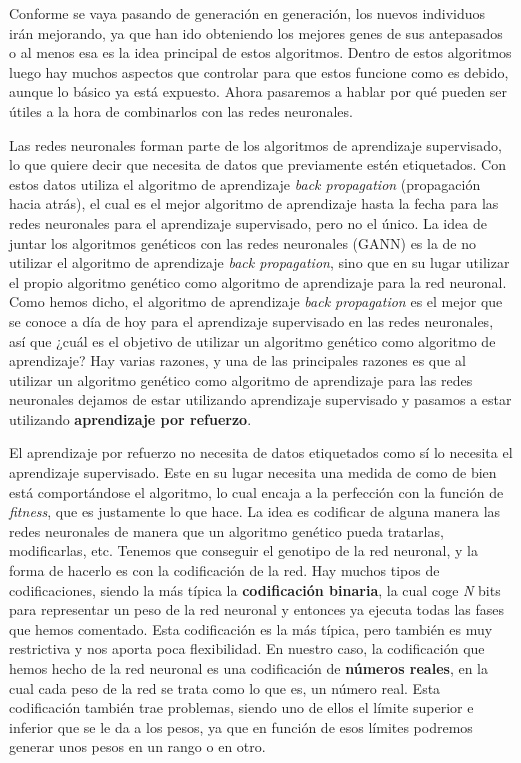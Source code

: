 Conforme se vaya pasando de generación en generación, los nuevos individuos irán mejorando, ya que han ido obteniendo los mejores genes de sus antepasados o al menos esa es la idea principal de estos algoritmos. Dentro de estos algoritmos luego hay muchos aspectos que controlar para que estos funcione como es debido, aunque lo básico ya está expuesto. Ahora pasaremos a hablar por qué pueden ser útiles a la hora de combinarlos con las redes neuronales.

Las redes neuronales forman parte de los algoritmos de aprendizaje supervisado, lo que quiere decir que necesita de datos que previamente estén etiquetados. Con estos datos utiliza el algoritmo de aprendizaje \textit{back propagation} (propagación hacia atrás), el cual es el mejor algoritmo de aprendizaje hasta la fecha para las redes neuronales para el aprendizaje supervisado, pero no el único. La idea de juntar los algoritmos genéticos con las redes neuronales (GANN) es la de no utilizar el algoritmo de aprendizaje \textit{back propagation}, sino que en su lugar utilizar el propio algoritmo genético como algoritmo de aprendizaje para la red neuronal. Como hemos dicho, el algoritmo de aprendizaje \textit{back propagation} es el mejor que se conoce a día de hoy para el aprendizaje supervisado en las redes neuronales, así que ¿cuál es el objetivo de utilizar un algoritmo genético como algoritmo de aprendizaje? Hay varias razones, y una de las principales razones es que al utilizar un algoritmo genético como algoritmo de aprendizaje para las redes neuronales dejamos de estar utilizando aprendizaje supervisado y pasamos a estar utilizando \textbf{aprendizaje por refuerzo}.

El aprendizaje por refuerzo no necesita de datos etiquetados como sí lo necesita el aprendizaje supervisado. Este en su lugar necesita una medida de como de bien está comportándose el algoritmo, lo cual encaja a la perfección con la función de \textit{fitness}, que es justamente lo que hace. La idea es codificar de alguna manera las redes neuronales de manera que un algoritmo genético pueda tratarlas, modificarlas, etc. Tenemos que conseguir el genotipo de la red neuronal, y la forma de hacerlo es con la codificación de la red. Hay muchos tipos de codificaciones, siendo la más típica la \textbf{codificación binaria}, la cual coge \textit{N} bits para representar un peso de la red neuronal y entonces ya ejecuta todas las fases que hemos comentado. Esta codificación es la más típica, pero también es muy restrictiva y nos aporta poca flexibilidad. En nuestro caso, la codificación que hemos hecho de la red neuronal es una codificación de \textbf{números reales}, en la cual cada peso de la red se trata como lo que es, un número real. Esta codificación también trae problemas, siendo uno de ellos el límite superior e inferior que se le da a los pesos, ya que en función de esos límites podremos generar unos pesos en un rango o en otro.

